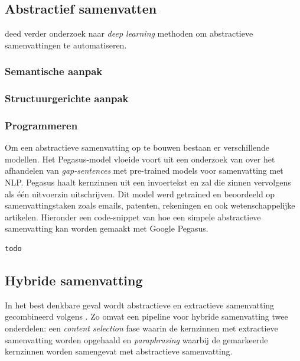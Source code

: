 \subsection{Abstractief samenvatten}


\textcite{Cao2022} deed verder onderzoek naar \textit{deep learning} methoden om abstractieve samenvattingen te automatiseren. 

\subsubsection{Semantische aanpak}


\subsubsection{Structuurgerichte aanpak}

\subsubsection{Programmeren}

Om een abstractieve samenvatting op te bouwen bestaan er verschillende modellen. Het Pegasus-model vloeide voort uit een onderzoek van \textcite{Zhang2020} over het afhandelen van \textit{gap-sentences} met pre-trained models voor samenvatting met NLP. Pegasus haalt kernzinnen uit een invoertekst en zal die zinnen vervolgens als één uitvoerzin uitschrijven. Dit model werd getrained en beoordeeld op samenvattingstaken zoals emails, patenten, rekeningen en ook wetenschappelijke artikelen. Hieronder een code-snippet van hoe een simpele abstractieve samenvatting kan worden gemaakt met Google Pegasus.

\begin{lstlisting}[language=Python]
todo
\end{lstlisting}


\subsection{Hybride samenvatting}

In het best denkbare geval wordt abstractieve en extractieve samenvatting gecombineerd volgens \textcite{Hsu2018, Huang2019}. Zo omvat een pipeline voor hybride samenvatting twee onderdelen: een \textit{content selection} fase waarin de kernzinnen met extractieve samenvatting worden opgehaald en \textit{paraphrasing} waarbij de gemarkeerde kernzinnen worden samengevat met abstractieve samenvatting. 

